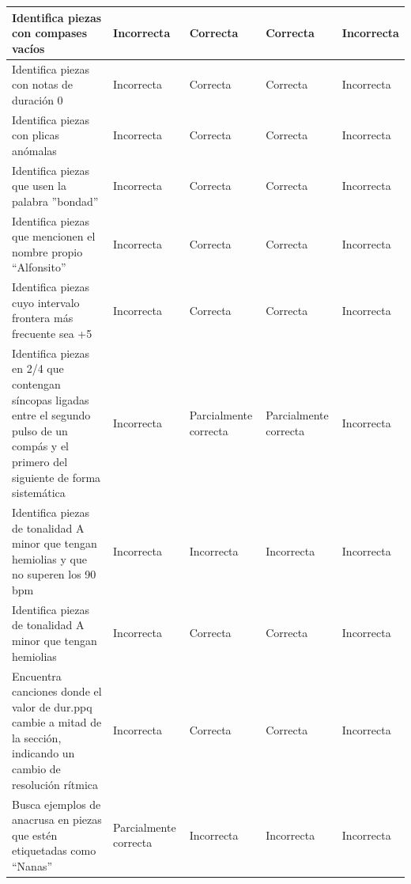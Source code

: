 \begin{longtable}{|m{5cm}|m{2.5cm}|m{2.5cm}|m{2.5cm}|m{2.5cm}|}
\hline

Identifica piezas con compases vacíos &
Incorrecta &
Correcta &
Correcta &
Incorrecta \\

\hline

Identifica piezas con notas de duración 0 &
Incorrecta &
Correcta &
Correcta &
Incorrecta \\

\hline

Identifica piezas con plicas anómalas &
Incorrecta &
Correcta &
Correcta &
Incorrecta \\

\hline

Identifica piezas que usen la palabra ''bondad'' &
Incorrecta &
Correcta &
Correcta &
Incorrecta \\

\hline

Identifica piezas que mencionen el nombre propio ``Alfonsito'' &
Incorrecta &
Correcta &
Correcta &
Incorrecta \\

\hline

Identifica piezas cuyo intervalo frontera más frecuente sea +5 &
Incorrecta &
Correcta &
Correcta &
Incorrecta \\

\hline

Identifica piezas en 2/4 que contengan síncopas ligadas entre el segundo pulso de un compás y el primero del siguiente de forma sistemática &
Incorrecta &
Parcialmente correcta &
Parcialmente correcta &
Incorrecta \\

\hline

Identifica piezas de tonalidad A minor que tengan hemiolias y que no superen los 90 bpm &
Incorrecta &
Incorrecta &
Incorrecta &
Incorrecta \\

\hline

Identifica piezas de tonalidad A minor que tengan hemiolias &
Incorrecta &
Correcta &
Correcta &
Incorrecta \\

\hline

Encuentra canciones donde el valor de dur.ppq cambie a mitad de la sección, indicando un cambio de resolución rítmica &
Incorrecta &
Correcta &
Correcta &
Incorrecta \\

\hline

Busca ejemplos de anacrusa en piezas que estén etiquetadas como ``Nanas'' &
Parcialmente correcta &
Incorrecta &
Incorrecta &
Incorrecta \\


\end{longtable}
